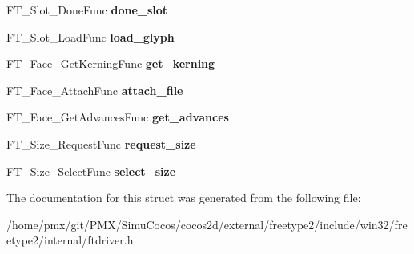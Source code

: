 \begin{DoxyCompactItemize}
\item 
\mbox{\label{structFT__Driver__ClassRec___a548a343f5921f5d341142bf3743c42d4}} 
F\+T\+\_\+\+Slot\+\_\+\+Done\+Func {\bfseries done\+\_\+slot}
\item 
\mbox{\label{structFT__Driver__ClassRec___a49dbd71e64094d4d825b8b8d51dd4e47}} 
F\+T\+\_\+\+Slot\+\_\+\+Load\+Func {\bfseries load\+\_\+glyph}
\item 
\mbox{\label{structFT__Driver__ClassRec___a398395bfdbef65a8d531724d200ed91c}} 
F\+T\+\_\+\+Face\+\_\+\+Get\+Kerning\+Func {\bfseries get\+\_\+kerning}
\item 
\mbox{\label{structFT__Driver__ClassRec___a9caec9ae56a4bab9c90cede699279f29}} 
F\+T\+\_\+\+Face\+\_\+\+Attach\+Func {\bfseries attach\+\_\+file}
\item 
\mbox{\label{structFT__Driver__ClassRec___aad560cd145b6d7cab7eae79194b1d724}} 
F\+T\+\_\+\+Face\+\_\+\+Get\+Advances\+Func {\bfseries get\+\_\+advances}
\item 
\mbox{\label{structFT__Driver__ClassRec___a03ff7c2e4a2fb6d08eb481b03a78e8de}} 
F\+T\+\_\+\+Size\+\_\+\+Request\+Func {\bfseries request\+\_\+size}
\item 
\mbox{\label{structFT__Driver__ClassRec___a1b365eb82525dae0a816974d949fe0dd}} 
F\+T\+\_\+\+Size\+\_\+\+Select\+Func {\bfseries select\+\_\+size}
\end{DoxyCompactItemize}


The documentation for this struct was generated from the following file\+:\begin{DoxyCompactItemize}
\item 
/home/pmx/git/\+P\+M\+X/\+Simu\+Cocos/cocos2d/external/freetype2/include/win32/freetype2/internal/ftdriver.\+h\end{DoxyCompactItemize}
